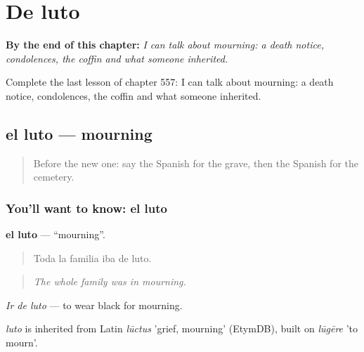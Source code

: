 
\chapter{De luto}
\label{ch:es-de-luto}

\begin{chapteropening}
\textbf{By the end of this chapter:} \emph{I can talk about mourning: a death notice, condolences, the coffin and what someone inherited.}

Complete the last lesson of chapter 557: I can talk about mourning: a death notice, condolences, the coffin and what someone inherited.
\end{chapteropening}

\section[el luto]{el luto — mourning}

\label{lesson:ES-C557-luto}



\begin{quote}
Before the new one: say the Spanish for the grave, then the Spanish for the cemetery.
\end{quote}

\subsection*{You'll want to know: el luto}
\textbf{el luto} — \textquotedblleft{}mourning\textquotedblright{}.

\begin{quote}
Toda la familia iba de luto.
\end{quote}

\begin{quote}
\emph{The whole family was in mourning.}
\end{quote}

\emph{Ir de luto} — to wear black for mourning.

\begin{cousinweb}
\emph{luto} is inherited from Latin \emph{lūctus} 'grief, mourning' (EtymDB), built on \emph{lūgēre} 'to mourn'.
\end{cousinweb}

